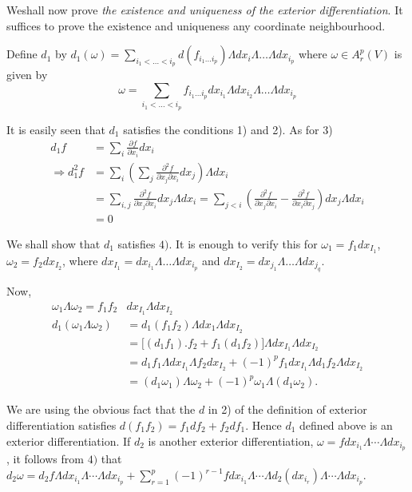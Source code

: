 We\pageoriginale shall now prove \textit{the existence and uniqueness of the
  exterior differentiation}. It suffices to prove the existence and
uniqueness any coordinate neighbourhood. 

Define $d_1$ by $d_1 (\omega) = \sum \limits_{i_1< \dots < i_p} d
(f_{i_{1}\ldots i_p}) \Lambda dx_i \Lambda \ldots \Lambda dx_{i_{p}}$
where $\omega \in A^p_r (V)$ is given by  
$$
\omega = \sum_{i_1< \dots < i_p}  f_{i_{1}\ldots i_p} dx_{i_{1}}
\Lambda dx_{i_{2}} \Lambda \ldots \Lambda dx_{i_{p}}  
$$

It is easily seen that $d_1$ satisfies the conditions 1) and 2). As for 3)
\begin{align*}
  d_1 f &= \sum_{i} \frac{\partial f}{\partial x_i} dx_i \\
  \Rightarrow d^2_1 f &= \sum_{i} \left( \sum_{j} \frac{\partial^2
    f}{\partial x_j \partial x_i} dx_j \right) \Lambda dx_i \\ 
  &= \sum_{i, j} \frac{\partial^2 f}{\partial x_j \partial x_i} dx_j
  \Lambda dx_i = \sum_{j < i} \left(\frac{\partial^2 f}{\partial x_j
    \partial x_i} - \frac{\partial^2 f}{\partial x_i \partial x_j}\right)
  dx_j \Lambda dx_i \\ 
  &= 0
\end{align*}

We shall show that $d_1$ satisfies $4)$. It is enough to verify this
for $\omega_1 = f_1 dx_{I_{1}}$, $\omega_2 = f_2 dx_{I_{2}}$, where
$dx_{I_{1}} = dx_{i_{1}} \Lambda \ldots \Lambda dx_{i_{p}}$ and
$dx_{I_{2}} = dx_{j_{1}} \Lambda \ldots \Lambda dx_{j_{q}}$. 

Now,\pageoriginale
\begin{align*}
  \omega_1 \Lambda \omega_2 = f_1 f_2 &dx_{I_{1}} \Lambda dx_{I_{2}} \\
  d_1 (\omega_1 \Lambda \omega_2 ) &= d_1  (f_1f_2) \Lambda dx_1
  \Lambda dx_{I_{2}} \\ 
  &= \big [ (d_1 f_1). f_2 + f_1 (d_1 f_2) \big ] \Lambda dx_{I_{1}}
  \Lambda dx_{I_{2}} \\ 
  &=  d_1 f_1 \Lambda dx_{I_{1}} \Lambda  f_2  dx_{I_{2}}  + (-1)^p
  f_1dx_{I_{1}} \Lambda d_1 f_2 \Lambda dx_{I_{2}} \\ 
  &=  (d_1 \omega_1 ) \Lambda \omega_2 + (-1)^p \omega_1 \Lambda (d_1
  \omega_2 ).
\end{align*}

We are using the obvious fact that the $d$ in 2) of the definition of
exterior differentiation satisfies  $d (f_1 f_2) = f_1 df_2 + f_2
df_1$. Hence $d_1$ defined above is an exterior differentiation. If
$d_2$ is another exterior differentiation, $\omega = f  dx_{i_{1}}
\Lambda \cdots \Lambda dx_{i_{p}}$, it follows  from $4)$ that $d_2
\omega = d_2 f \Lambda dx_{i_{1}} \Lambda \cdots \Lambda dx_{i_{p}} +
\sum^{p}_{r=1} (-1)^{r-1} f  dx_{i_{1}}  \Lambda \cdots \Lambda d_2
(dx_{i_{r}} ) \Lambda \cdots \Lambda dx_{i_{p}}$. 

